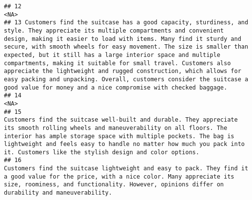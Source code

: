 \documentclass[
]{article}
\begin{document}
\begin{verbatim}
## 12                                                                                                                                                                                                                                                                                                                                                                                                                                                                                                                                                                                                                       <NA>
## 13 Customers find the suitcase has a good capacity, sturdiness, and style. They appreciate its multiple compartments and convenient design, making it easier to load with items. Many find it sturdy and secure, with smooth wheels for easy movement. The size is smaller than expected, but it still has a large interior space and multiple compartments, making it suitable for small travel. Customers also appreciate the lightweight and rugged construction, which allows for easy packing and unpacking. Overall, customers consider the suitcase a good value for money and a nice compromise with checked baggage.
## 14                                                                                                                                                                                                                                                                                                                                                                                                                                                                                                                                                                                                                       <NA>
## 15                                                                                                                                                                                                                                                                                     Customers find the suitcase well-built and durable. They appreciate its smooth rolling wheels and maneuverability on all floors. The interior has ample storage space with multiple pockets. The bag is lightweight and feels easy to handle no matter how much you pack into it. Customers like the stylish design and color options.
## 16                                                                                                                                                                                                                                                                                                                                                                                  Customers find the suitcase lightweight and easy to pack. They find it a good value for the price, with a nice color. Many appreciate its size, roominess, and functionality. However, opinions differ on durability and maneuverability.

\end{verbatim}
\end{document}
